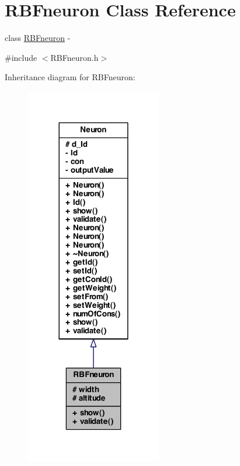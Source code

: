 \hypertarget{class_r_b_fneuron}{
\section{RBFneuron Class Reference}
\label{class_r_b_fneuron}
}


class \hyperlink{class_r_b_fneuron}{RBFneuron} -\/  




{\ttfamily \#include $<$RBFneuron.h$>$}



Inheritance diagram for RBFneuron:\nopagebreak
\begin{figure}[H]
\begin{center}
\leavevmode
\includegraphics[width=168pt]{class_r_b_fneuron__inherit__graph}
\end{center}
\end{figure}


